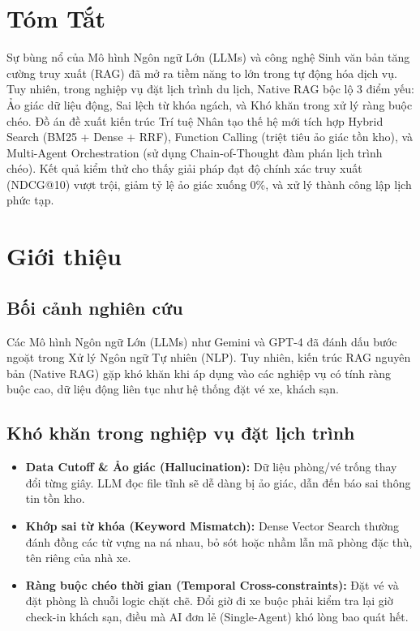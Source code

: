 \documentclass[12pt,a4paper]{report}
\begin{document}
\chapter*{Tóm Tắt}
Sự bùng nổ của Mô hình Ngôn ngữ Lớn (LLMs) và công nghệ Sinh văn bản tăng cường truy xuất (RAG) đã mở ra tiềm năng to lớn trong tự động hóa dịch vụ. Tuy nhiên, trong nghiệp vụ đặt lịch trình du lịch, Native RAG bộc lộ 3 điểm yếu: Ảo giác dữ liệu động, Sai lệch từ khóa ngách, và Khó khăn trong xử lý ràng buộc chéo. Đồ án đề xuất kiến trúc Trí tuệ Nhân tạo thế hệ mới tích hợp Hybrid Search (BM25 + Dense + RRF), Function Calling (triệt tiêu ảo giác tồn kho), và Multi-Agent Orchestration (sử dụng Chain-of-Thought đàm phán lịch trình chéo). Kết quả kiểm thử cho thấy giải pháp đạt độ chính xác truy xuất (NDCG@10) vượt trội, giảm tỷ lệ ảo giác xuống 0\%, và xử lý thành công lập lịch phức tạp.

\tableofcontents
\listoftables


\chapter{Giới thiệu}
\section{Bối cảnh nghiên cứu}
Các Mô hình Ngôn ngữ Lớn (LLMs) như Gemini và GPT-4 đã đánh dấu bước ngoặt trong Xử lý Ngôn ngữ Tự nhiên (NLP). Tuy nhiên, kiến trúc RAG nguyên bản (Native RAG) gặp khó khăn khi áp dụng vào các nghiệp vụ có tính ràng buộc cao, dữ liệu động liên tục như hệ thống đặt vé xe, khách sạn. 

\section{Khó khăn trong nghiệp vụ đặt lịch trình}
\begin{itemize}
    \item \textbf{Data Cutoff \& Ảo giác (Hallucination):} Dữ liệu phòng/vé trống thay đổi từng giây. LLM đọc file tĩnh sẽ dễ dàng bị ảo giác, dẫn đến báo sai thông tin tồn kho.
    \item \textbf{Khớp sai từ khóa (Keyword Mismatch):} Dense Vector Search thường đánh đồng các từ vựng na ná nhau, bỏ sót hoặc nhầm lẫn mã phòng đặc thù, tên riêng của nhà xe.
    \item \textbf{Ràng buộc chéo thời gian (Temporal Cross-constraints):} Đặt vé và đặt phòng là chuỗi logic chặt chẽ. Đổi giờ đi xe buộc phải kiểm tra lại giờ check-in khách sạn, điều mà AI đơn lẻ (Single-Agent) khó lòng bao quát hết.
\end{itemize}
\end{document}
